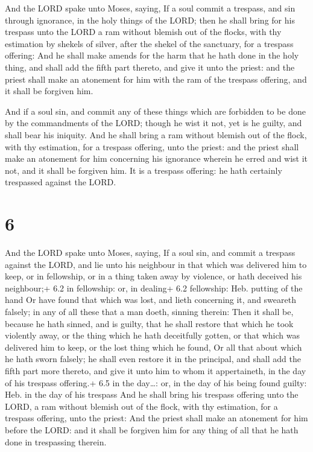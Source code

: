  And the LORD spake unto Moses, saying,  If
a soul commit a trespass, and sin through ignorance, in the holy things
of the LORD; then he shall bring for his trespass unto the LORD a ram
without blemish out of the flocks, with thy estimation by shekels of
silver, after the shekel of the sanctuary, for a trespass offering:
 And he shall make amends for the harm that he hath done in
the holy thing, and shall add the fifth part thereto, and give it unto
the priest: and the priest shall make an atonement for him with the ram
of the trespass offering, and it shall be forgiven him.

 And if a soul sin, and commit any of these things which
are forbidden to be done by the commandments of the LORD; though he wist
it not, yet is he guilty, and shall bear his iniquity.  And
he shall bring a ram without blemish out of the flock, with thy
estimation, for a trespass offering, unto the priest: and the priest
shall make an atonement for him concerning his ignorance wherein he
erred and wist it not, and it shall be forgiven him.  It is
a trespass offering: he hath certainly trespassed against the LORD.

\hypertarget{section-5}{%
\section{6}\label{section-5}}

 And the LORD spake unto Moses, saying,  If a
soul sin, and commit a trespass against the LORD, and lie unto his
neighbour in that which was delivered him to keep, or in fellowship, or
in a thing taken away by violence, or hath deceived his neighbour;+ 6.2
in fellowship: or, in dealing+ 6.2 fellowship: Heb. putting of the hand
 Or have found that which was lost, and lieth concerning it,
and sweareth falsely; in any of all these that a man doeth, sinning
therein:  Then it shall be, because he hath sinned, and is
guilty, that he shall restore that which he took violently away, or the
thing which he hath deceitfully gotten, or that which was delivered him
to keep, or the lost thing which he found,  Or all that
about which he hath sworn falsely; he shall even restore it in the
principal, and shall add the fifth part more thereto, and give it unto
him to whom it appertaineth, in the day of his trespass offering.+ 6.5
in the day\ldots: or, in the day of his being found guilty: Heb. in the
day of his trespass  And he shall bring his trespass
offering unto the LORD, a ram without blemish out of the flock, with thy
estimation, for a trespass offering, unto the priest:  And
the priest shall make an atonement for him before the LORD: and it shall
be forgiven him for any thing of all that he hath done in trespassing
therein.

